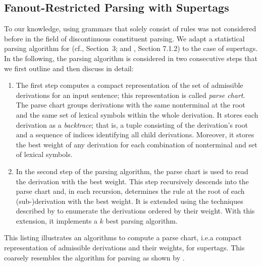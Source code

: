 \documentclass[../../document.tex]{subfiles}
\begin{document}
    \subsection{Fanout-Restricted Parsing with  Supertags}\label{sec:parsing:dcp}
    To our knowledge, using grammars that solely consist of  rules was not considered before in the field of discontinuous constituent parsing.
    We adapt a statistical parsing algorithm for  (cf.\@ \citealp{Burden05}, Section~3; and \citealp{Kal10}, Section 7.1.2) to the case of  supertags.
    In the following, the parsing algorithm is considered in two consecutive steps that we first outline and then discuss in detail:
    \begin{enumerate}
        \item \label{step:parsing:chart}
            The first step computes a compact representation of the set of admissible derivations for an input sentence; this representation is called \emph{parse chart}.
            The parse chart groups derivations with the same  nonterminal at the root and the same set of lexical symbols within the whole derivation.
            It stores each derivation as a \emph{backtrace}; that is, a tuple consisting of the derivation's root and a sequence of indices identifying all child derivations.
            Moreover, it stores the best weight of any derivation for each combination of  nonterminal and set of lexical symbols.
        \item \label{step:parsing:derivation}
            In the second step of the parsing algorithm, the parse chart is used to read the derivation with the best weight.
            This step recursively descends into the parse chart and, in each recursion, determines the rule at the root of each (sub-)derivation with the best weight.
            It is extended using the techniques described by \citet{HuaChia05} to enumerate the derivations ordered by their weight.
            With this extension, it implements a \(k\) best parsing algorithm.
    \end{enumerate}

    \begin{algorithm}
        \caption{\label{alg:parsing:chart}
            This listing illustrates an algorithms to compute a parse chart, i.e.\@ a compact representation of admissible derivations and their weights, for  supertags.
            This coarsely resembles the algorithm for parsing  as shown by \citet[the ``na\"ive algorithm'' in Section~3]{Burden05}.
        }
        
    \end{algorithm}
\end{document}
